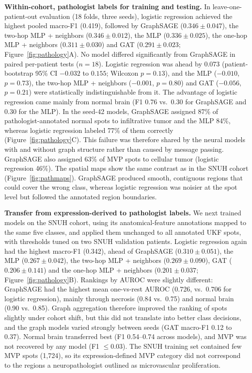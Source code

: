 \documentclass[11pt,letterpaper]{article}
\begin{document}
\textbf{Within-cohort, pathologist labels for training and testing.} In leave-one-patient-out evaluation (18 folds, three seeds), logistic regression achieved the highest pooled macro-F1 (0.419), followed by GraphSAGE ($0.346 \pm 0.047$), the two-hop MLP + neighbors ($0.346 \pm 0.012$), the MLP ($0.336 \pm 0.025$), the one-hop MLP + neighbors ($0.311 \pm 0.030$) and GAT ($0.291 \pm 0.023$; Figure~\ref{fig:pathology}A). No model differed significantly from GraphSAGE in paired per-patient tests ($n = 18$). Logistic regression was ahead by 0.073 (patient-bootstrap 95\% CI $-0.032$ to $0.155$; Wilcoxon $p = 0.13$), and the MLP ($-0.010$, $p = 0.73$), the two-hop MLP + neighbors ($-0.001$, $p = 0.80$) and GAT ($-0.056$, $p = 0.21$) were statistically indistinguishable from it. The advantage of logistic regression came mainly from normal brain (F1 0.76 vs.\ 0.30 for GraphSAGE and 0.30 for the MLP). In the seed-42 models, GraphSAGE assigned 87\% of pathologist-annotated normal spots to infiltrative tumor and the MLP 84\%, whereas logistic regression labeled 77\% of them correctly (Figure~\ref{fig:pathology}C). This failure was therefore shared by the neural models with and without graph structure rather than caused by message passing. GraphSAGE also assigned 63\% of MVP spots to cellular tumor (logistic regression 46\%). The spatial maps show the same contrast as in the SNUH cohort (Figure~\ref{fig:pathmaps}). GraphSAGE produced smooth, contiguous regions that could cover the wrong class, whereas logistic regression was noisier at the spot level but followed the annotated region boundaries.

\textbf{Transfer from expression-derived to pathologist labels.} We next trained models on the SNUH cohort, using its anatomical-feature annotations mapped to the same five classes, and applied them unchanged to all annotated UKF spots, with thresholds tuned on two SNUH validation patients. Logistic regression again had the highest macro-F1 (0.342), ahead of GraphSAGE ($0.310 \pm 0.051$), the MLP ($0.267 \pm 0.042$), the two-hop MLP + neighbors ($0.269 \pm 0.090$), GAT ($0.206 \pm 0.141$) and the one-hop MLP + neighbors ($0.201 \pm 0.037$; Figure~\ref{fig:pathology}B). Rankings by AUROC were slightly different: GraphSAGE had the highest mean one-vs-rest AUROC (0.726, vs.\ 0.706 for logistic regression), mainly through necrosis (0.84 vs.\ 0.75) and normal brain (0.90 vs.\ 0.85). Graph aggregation therefore improved the ranking of spots slightly under cohort shift, but this did not translate into better class decisions, and the graph models varied strongly between seeds (GAT macro-F1 0.12 to 0.37). Normal brain transferred best (F1 0.54--0.74 across models), and MVP was not recovered by any model (F1 $\le 0.03$). The SNUH training set contained few MVP spots (1{,}724), so its expression-defined MVP category did not correspond to the regions a neuropathologist outlined as microvascular proliferation.
\end{document}
